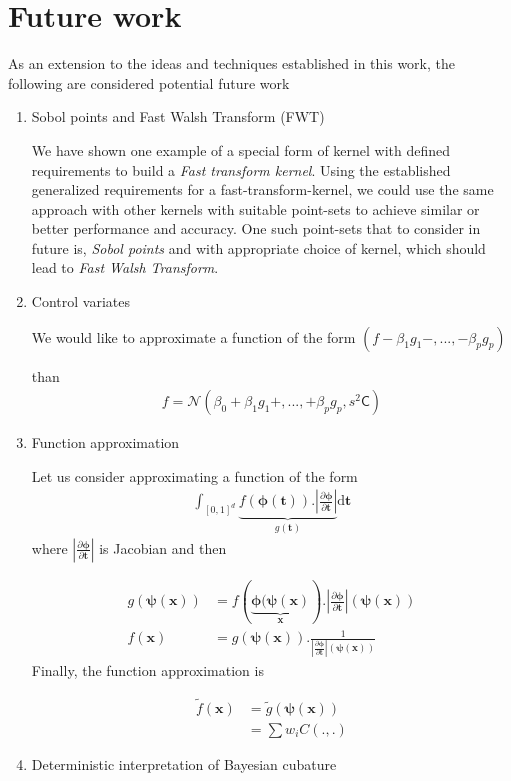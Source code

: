 \documentclass[twocolumn]{svjour3}          %
\newcommand{\bm}[1]{\boldsymbol{#1}}
\newcommand{\dif}[1]{\text{d}{#1}}
\newcommand{\vphi}{{\bm{\phi}}}
\newcommand{\vpsi}{{\bm{\psi}}}
\newcommand{\vt}{\bm{t}}
\newcommand{\vx}{\bm{x}}
\newcommand{\dvt}{\dif{\bm{t}}}
\newcommand{\mC}{\mathsf{C}}
\newcommand{\calN}{\mathcal{N}}
\def\abs#1{\ensuremath{\left \lvert #1 \right \rvert}}
\begin{document}
\section{Future work}
As an extension to the ideas and techniques established in this work, the following are considered potential future work

\begin{enumerate}


\item Sobol points and Fast Walsh Transform (FWT)

We have shown one example of a special form of kernel with defined requirements to build a \textit{Fast transform kernel}.
Using the established generalized requirements for a {fast-transform-kernel}, we could use the same approach with other kernels with suitable point-sets to achieve similar or better performance and accuracy. One such point-sets that to consider in future is, \textit{Sobol points} and with appropriate choice of kernel, which should lead to \textit{Fast Walsh Transform}.

\item Control variates

We would like to approximate a function of the form
$ (f - \beta_1 g_1 -, ... , - \beta_p g_p) $

than
\begin{align*}
f = \calN \left( \beta_0 + \beta_1 g_1 + , ... , + \beta_p g_p, s^2 \mC  \right)
\end{align*}

\item Function approximation

Let us consider approximating a function of the form
\begin{align*}
\int_{[0,1]^d} \underbrace{ f(\vphi(\vt)) . \abs{\frac{\partial \vphi}{\partial \vt}} }_{g(\vt)} \dvt
\end{align*}
where $\abs{\frac{\partial \vphi}{\partial \vt}}$ is Jacobian and then

\begin{align*}
g(\vpsi(\vx)) &= f( \underbrace{ \vphi(\vpsi(\vx) }_{\vx } ) . \abs{\frac{\partial \vphi}{\partial \vt} }  (\vpsi(\vx))
\\
f(\vx) &= g(\vpsi(\vx)) . \frac{1}{  \abs{\frac{\partial \vphi}{\partial \vt}}  (\vpsi(\vx)) }
\end{align*}
Finally, the function approximation is

\begin{align*}
\tilde{f}(\vx) &= \tilde{g}(\vpsi( \vx )) \\
&= \sum w_i C(.,.)
\end{align*}

\item Deterministic interpretation of Bayesian cubature

\end{enumerate}
\end{document}
